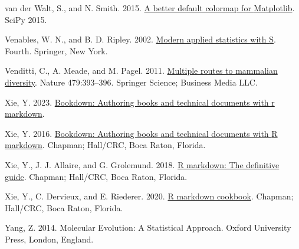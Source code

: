 \documentclass[fleqn,10pt,lineno]{wlpeerj} %
\newlength{\cslhangindent}
\newlength{\cslentryspacingunit} %
\newenvironment{CSLReferences}[2] %
 {%
  \setlength{\parindent}{0pt}
  \ifodd #1
  \let\oldpar\par
  \def\par{\hangindent=\cslhangindent\oldpar}
  \fi
  \setlength{\parskip}{#2\cslentryspacingunit}
 }%
 {}
\begin{document}
\begin{CSLReferences}{1}{0}
\leavevmode{}%
van der Walt, S., and N. Smith. 2015. \href{https://youtu.be/xAoljeRJ3lU}{A better default colormap for {Matplotlib}}. SciPy 2015.

\leavevmode{}%
Venables, W. N., and B. D. Ripley. 2002. \href{https://www.stats.ox.ac.uk/pub/MASS4/}{Modern applied statistics with {S}}. Fourth. Springer, New York.

\leavevmode{}%
Venditti, C., A. Meade, and M. Pagel. 2011. \href{https://doi.org/10.1038/nature10516}{Multiple routes to mammalian diversity}. Nature 479:393--396. Springer Science; Business Media {LLC}.

\leavevmode{}%
Xie, Y. 2023. \href{https://github.com/rstudio/bookdown}{Bookdown: Authoring books and technical documents with r markdown}.

\leavevmode{}%
Xie, Y. 2016. \href{https://bookdown.org/yihui/bookdown}{Bookdown: Authoring books and technical documents with {R} markdown}. Chapman; Hall/CRC, Boca Raton, Florida.

\leavevmode{}%
Xie, Y., J. J. Allaire, and G. Grolemund. 2018. \href{https://bookdown.org/yihui/rmarkdown}{R markdown: The definitive guide}. Chapman; Hall/CRC, Boca Raton, Florida.

\leavevmode{}%
Xie, Y., C. Dervieux, and E. Riederer. 2020. \href{https://bookdown.org/yihui/rmarkdown-cookbook}{R markdown cookbook}. Chapman; Hall/CRC, Boca Raton, Florida.

\leavevmode{}%
Yang, Z. 2014. Molecular {E}volution: A {S}tatistical {A}pproach. Oxford University Press, London, England.

\end{CSLReferences}
\end{document}
